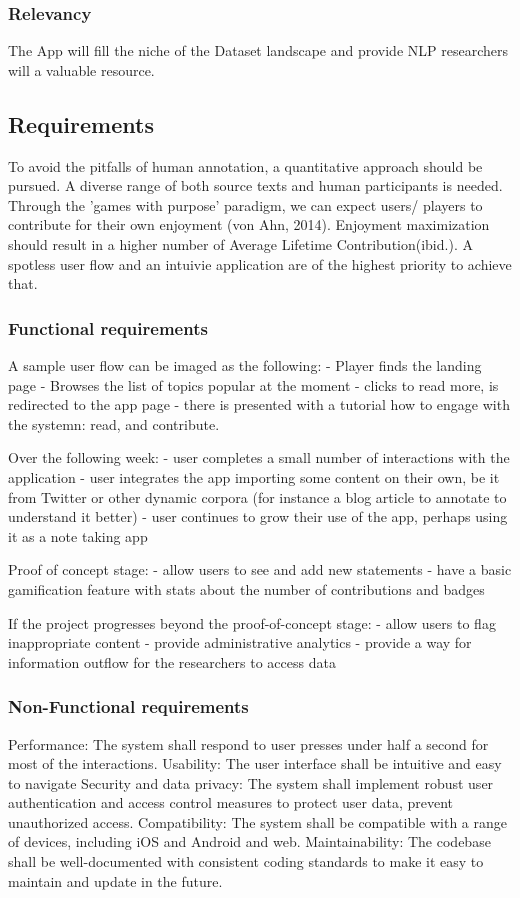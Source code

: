 \documentclass{article}
\begin{document}
\subsubsection{Relevancy}
The App will fill the niche of the Dataset landscape and provide NLP researchers will a valuable resource.

\subsection{Requirements}
To avoid the pitfalls of human annotation, a quantitative approach should be pursued. A diverse range of both source texts and human participants is needed.  Through the 'games with purpose' paradigm, we can expect users/ players to contribute for their own enjoyment (von Ahn, 2014). Enjoyment maximization should result in a higher number of Average Lifetime Contribution(ibid.).  A spotless user flow and an intuivie application are of the highest priority to achieve that.

\subsubsection{Functional requirements}
A sample user flow can be imaged as the following:
- Player finds the landing page
- Browses the list of topics popular at the moment
- clicks to read more, is redirected to the app page
- there is presented with a tutorial how to engage with the systemn: read, and contribute.

Over the following week:
- user completes a small number of interactions with the application
- user integrates the app importing some content on their own, be it from Twitter or other dynamic corpora (for instance a blog article to annotate to understand it better)
- user continues to grow their use of the app, perhaps using it as a note taking app

Proof of concept stage:
- allow users to see and add new statements
- have a basic gamification feature with stats about the number of contributions and badges

If the project progresses beyond the proof-of-concept stage:
- allow users to flag inappropriate content
- provide administrative analytics 
- provide a way for information outflow for the researchers to access data

\subsubsection{Non-Functional requirements}
Performance: The system shall respond to user presses under half a second for most of the interactions.
Usability: The user interface shall be intuitive and easy to navigate
Security and data privacy: The system shall implement robust user authentication and access control measures to protect user data, prevent unauthorized access.
Compatibility: The system shall be compatible with a range of devices, including iOS and Android and web.
Maintainability: The codebase shall be well-documented with consistent coding standards to make it easy to maintain and update in the future.
\end{document}

